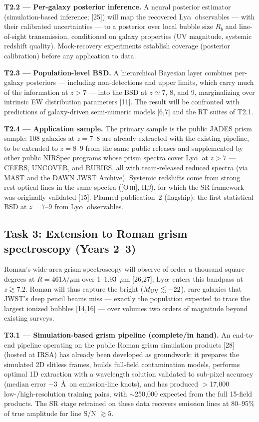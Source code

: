 \documentclass[12pt,letterpaper]{article}
\newcommand{\lya}{Ly$\alpha$}
\begin{document}
\textbf{T2.2 --- Per-galaxy posterior inference.} A neural posterior
estimator (simulation-based inference; [25]) will map the recovered
\lya\ observables --- with their calibrated uncertainties --- to a
posterior over local bubble size $R_b$ and line-of-sight transmission,
conditioned on galaxy properties (UV magnitude, systemic redshift
quality). Mock-recovery experiments establish coverage (posterior
calibration) before any application to data.

\textbf{T2.3 --- Population-level BSD.} A hierarchical Bayesian layer
combines per-galaxy posteriors --- including non-detections and upper
limits, which carry much of the information at $z>7$ --- into the BSD at
$z\simeq7$, 8, and 9, marginalizing over intrinsic EW distribution
parameters [11]. The result will be confronted with predictions of
galaxy-driven semi-numeric models [6,7] and the RT suites of T2.1.

\textbf{T2.4 --- Application sample.} The primary sample is the public
JADES prism sample: 108 galaxies at $z=7$--$8$ are already extracted
with the existing pipeline, to be extended to $z=8$--$9$ from the same
public releases and supplemented by other public NIRSpec programs whose
prism spectra cover \lya\ at $z>7$ --- CEERS, UNCOVER, and RUBIES, all
with team-released reduced spectra (via MAST and the DAWN JWST
Archive). Systemic redshifts come from strong rest-optical lines in the
same spectra ([O\,\textsc{iii}], H$\beta$), for which the SR framework
was originally validated [15]. Planned publication~2 (flagship): the
first statistical BSD at $z=7$--$9$ from \lya\ observables.

\subsection{Task 3: Extension to Roman grism spectroscopy (Years 2--3)}
\label{sec:task3}
Roman's wide-area grism spectroscopy will observe of order a thousand
square degrees at $R=461\lambda/\mu$m over 1--1.93~$\mu$m [26,27]; \lya\
enters this bandpass at $z\gtrsim7.2$. Roman will thus capture the
bright ($M_{\rm UV}\lesssim-22$), rare galaxies that JWST's deep pencil
beams miss --- exactly the population expected to trace the largest
ionized bubbles [14,16] --- over volumes two orders of magnitude beyond
existing surveys.

\textbf{T3.1 --- Simulation-based grism pipeline (complete/in hand).} An
end-to-end pipeline operating on the public Roman grism simulation
products [28] (hosted at IRSA) has already been developed as
groundwork: it prepares the simulated 2D slitless frames, builds
full-field contamination models, performs optimal 1D extraction with a
wavelength solution validated to sub-pixel accuracy (median error
$-3$~\AA\ on emission-line knots), and has produced $>$17,000
low-/high-resolution training pairs, with $\sim$250,000 expected from the
full 15-field products. The SR stage retrained on these data recovers
emission lines at 80--95\% of true amplitude for line S/N $\gtrsim5$.
\end{document}
